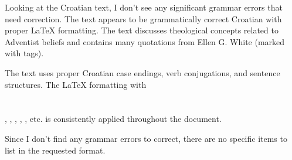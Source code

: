 Looking at the Croatian text, I don't see any significant grammar errors that need correction. The text appears to be grammatically correct Croatian with proper LaTeX formatting. The text discusses theological concepts related to Adventist beliefs and contains many quotations from Ellen G. White (marked with \egw{} tags).

The text uses proper Croatian case endings, verb conjugations, and sentence structures. The LaTeX formatting with \chapter{}, \emcap{}, \textbf{}, \underline{}, \textit{}, etc. is consistently applied throughout the document.

Since I don't find any grammar errors to correct, there are no specific items to list in the requested format.